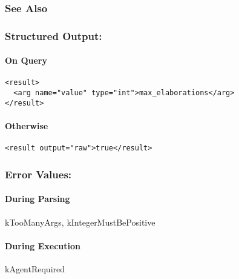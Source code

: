 \subsubsection*{See Also}
\subsubsection*{Structured Output:}
\paragraph*{On Query}
\begin{verbatim}
<result>
  <arg name="value" type="int">max_elaborations</arg>
</result>
\end{verbatim}
\paragraph*{Otherwise}
\begin{verbatim}
<result output="raw">true</result>
\end{verbatim}
\subsubsection*{Error Values:}
\paragraph*{During Parsing}
 kTooManyArgs, kIntegerMustBePositive
\paragraph*{During Execution}
 kAgentRequired
